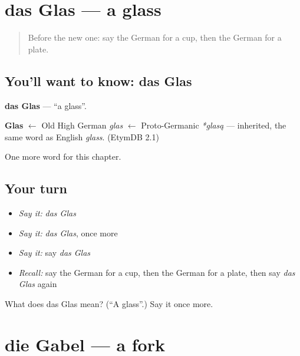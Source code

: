 \section[das Glas]{das Glas — a glass}

\label{lesson:GE-C79-glas}



\begin{quote}
Before the new one: say the German for a cup, then the German for a plate.
\end{quote}

\subsection*{You'll want to know: das Glas}
\textbf{das Glas} — \textquotedblleft{}a glass\textquotedblright{}.

\begin{cousinweb}
\textbf{Glas} $\leftarrow$ Old High German \emph{glas} $\leftarrow$ Proto-Germanic \emph{*glasą} — inherited, the same word as English \emph{glass}. (EtymDB 2.1)
\end{cousinweb}

\begin{grammarlens}[title={What you've built}]
One more word for this chapter.
\end{grammarlens}

\subsection*{Your turn}
\begin{itemize}
\raggedright
  \item \emph{Say it:} \emph{das Glas}
  \item \emph{Say it:} \emph{das Glas}, once more
  \item \emph{Say it:} say \emph{das Glas}
  \item \emph{Recall:} say the German for a cup, then the German for a plate, then say \emph{das Glas} again
\end{itemize}

\begin{tcolorbox}[breakable,colback=teal!4,colframe=teal!35!black,title={Before you move on}]
What does das Glas mean? (\textquotedblleft{}A glass\textquotedblright{}.) Say it once more.
\end{tcolorbox}
\section[die Gabel]{die Gabel — a fork}

